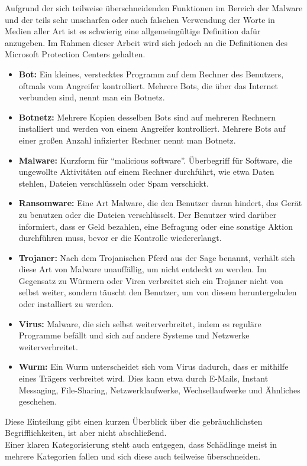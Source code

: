 Aufgrund der sich teilweise überschneidenden Funktionen im Bereich der Malware und der teils sehr unscharfen oder auch falschen Verwendung der Worte in Medien aller Art ist es schwierig eine allgemeingültige Definition dafür anzugeben. Im Rahmen dieser Arbeit wird sich jedoch an die Definitionen des Microsoft Protection Centers \cite{malware_pc} gehalten.

		\begin{itemize}
			\item \textbf{Bot:} Ein kleines, verstecktes Programm auf dem Rechner des Benutzers, oftmals vom Angreifer kontrolliert. Mehrere Bots, die über das Internet verbunden sind, nennt man ein Botnetz.
			\item \textbf{Botnetz:} Mehrere Kopien des­sel­ben Bots sind auf mehreren Rechnern installiert und werden von einem Angreifer kontrolliert. Mehrere Bots auf einer großen Anzahl infizierter Rechner nennt man Botnetz.
			\item \textbf{Malware:}	Kurzform für ``malicious software''. Überbegriff für Software, die ungewollte Aktivitäten auf einem Rechner durchführt, wie etwa Daten stehlen, Dateien verschlüsseln oder Spam verschickt.
			\item \textbf{Ransomware:} Eine Art Malware, die den Benutzer daran hindert, das Gerät zu benutzen oder die Dateien verschlüsselt. Der Benutzer wird darüber informiert, dass er Geld bezahlen, eine Befragung oder eine sonstige Aktion durchführen muss, bevor er die Kontrolle wiedererlangt.
			\item \textbf{Trojaner:} Nach dem Trojanischen Pferd aus der Sage benannt, verhält sich diese Art von Malware unauffällig, um nicht entdeckt zu werden. Im Gegensatz zu Würmern oder Viren verbreitet sich ein Trojaner nicht von selbst weiter, sondern täuscht den Benutzer, um von diesem heruntergeladen oder installiert zu werden.
			\item \textbf{Virus:} Malware, die sich selbst weiterverbreitet, indem es reguläre Programme befällt und sich auf andere Systeme und Netzwerke weiterverbreitet.
			\item \textbf{Wurm:} Ein Wurm unterscheidet sich vom Virus dadurch, dass er mithilfe eines Trägers verbreitet wird. Dies kann etwa durch E-Mails, Instant Messaging, File-Sharing, Netzwerklaufwerke, Wechsellaufwerke und Ähnliches geschehen.
		\end{itemize}
Diese Einteilung gibt einen kurzen Überblick über die gebräuchlichsten Begrifflichkeiten, ist aber nicht abschließend. \\
Einer klaren Kategorisierung steht auch entgegen, dass Schädlinge meist in mehrere Kategorien fallen und sich diese auch teilweise überschneiden.